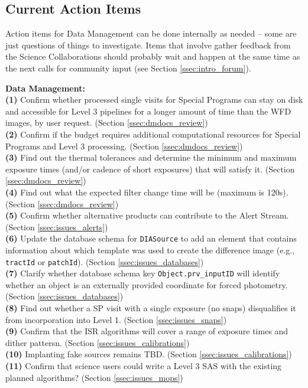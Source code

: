 \documentclass[DM,lsstdraft,toc]{lsstdoc}
\begin{document}
\subsection{Current Action Items}\label{ssec:intro_action}

Action items for Data Management can be done internally as needed -- some are just questions of things to investigate. Items that involve gather feedback from the Science Collaborations should probably wait and happen at the same time as the next calls for community input (see Section \ref{ssec:intro_forum}).

\noindent \textbf{Data Management: } \\
\textbf{(1)} Confirm whether processed single visits for Special Programs can stay on disk and accessible for Level 3 pipelines for a longer amount of time than the WFD images, by user request. (Section \ref{ssec:dmdocs_review}) \\
\textbf{(2)} Confirm if the budget requires additional computational resources for Special Programs and Level 3 processing. (Section \ref{ssec:dmdocs_review}) \\
\textbf{(3)} Find out the thermal tolerances and determine the minimum and maximum exposure times (and/or cadence of short exposures) that will satisfy it. (Section \ref{ssec:dmdocs_review}) \\
\textbf{(4)} Find out what the expected filter change time will be (maximum is 120s). (Section \ref{ssec:dmdocs_review}) \\
\textbf{(5)} Confirm whether alternative products can contribute to the Alert Stream. (Section \ref{ssec:issues_alerts}) \\
\textbf{(6)} Update the database schema for {\tt DIASource} to add an element that contains information about which template was used to create the difference image (e.g., {\tt tractId} or {\tt patchId}). (Section \ref{ssec:issues_databases}) \\
\textbf{(7)} Clarify whether database schema key {\tt Object.prv\_inputID} will identify whether an object is an externally provided coordinate for forced photometry. (Section \ref{ssec:issues_databases}) \\
\textbf{(8)} Find out whether a SP visit with a single exposure (no snaps) disqualifies it from incorporation into Level 1. (Section \ref{ssec:issues_snaps}) \\
\textbf{(9)} Confirm that the ISR algorithms will cover a range of exposure times and dither pattersn. (Section \ref{ssec:issues_calibrations}) \\
\textbf{(10)} Implanting fake sources remains TBD. (Section \ref{ssec:issues_calibrations}) \\
\textbf{(11)} Confirm that science users could write a Level 3 SAS with the existing planned algorithms? (Section \ref{ssec:issues_mops}) 
\end{document}
